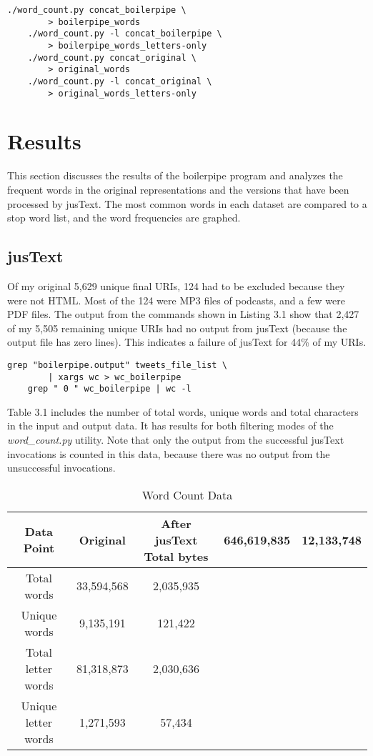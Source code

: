 \documentclass[a4paper,12pt]{article}
\begin{document}
\begin{lstlisting}[basicstyle=\ttfamily,caption={Counting words in concatenated data}]
    ./word_count.py concat_boilerpipe \
        > boilerpipe_words
    ./word_count.py -l concat_boilerpipe \
        > boilerpipe_words_letters-only
    ./word_count.py concat_original \
        > original_words
    ./word_count.py -l concat_original \
        > original_words_letters-only
\end{lstlisting}

\section{Results}
This section discusses the results of the boilerpipe program and analyzes the frequent words in the original
representations and the versions that have been processed by jusText. The most common words in each dataset
are compared to a stop word list, and the word frequencies are graphed.

\subsection{jusText}
Of my original 5,629 unique final URIs, 124 had to be excluded because they were not HTML. Most of the 124 were
MP3 files of podcasts, and a few were PDF files. The output from the commands shown in Listing 3.1 show that
2,427 of my 5,505 remaining unique URIs had no output from jusText (because the output file has zero lines).
This indicates a failure of jusText for 44\% of my URIs.

\begin{lstlisting}[basicstyle=\ttfamily,caption={Counting failed jusText runs}]
    grep "boilerpipe.output" tweets_file_list \
        | xargs wc > wc_boilerpipe
    grep " 0 " wc_boilerpipe | wc -l
\end{lstlisting}

Table 3.1 includes the number of total words, unique words and total characters in the input and
output data. It has results for both filtering modes of the \emph{word\_count.py} utility. Note that only the
output from the successful jusText invocations is counted in this data, because there was no output from the
unsuccessful invocations.

\begin{table}[H]
\centering
\caption{Word Count Data}
\begin{tabular}{ | c | c | c | }
\hline
\textbf{Data Point}  & \textbf{Original} & \textbf{After jusText}
Total bytes          & 646,619,835  & 12,133,748    \\ \hline
Total words          & 33,594,568   & 2,035,935     \\ \hline
Unique words         & 9,135,191    & 121,422       \\ \hline
Total letter words   & 81,318,873   & 2,030,636     \\ \hline
Unique letter words  & 1,271,593    & 57,434        \\ \hline
\end{tabular}
\end{table}
\end{document}
